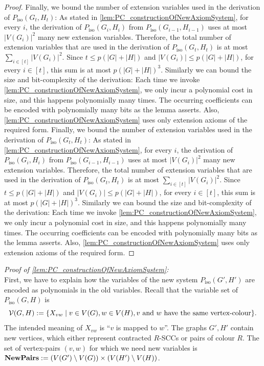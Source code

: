 \documentclass[10pt,a4paper]{article}
\newcommand{\Pairs}{\text{\upshape \textbf{NewPairs}}}
\newcommand{\Vv}{{\cal V}}
\newcommand{\Piso}{P_{\text{iso}}}
\begin{document}
\begin{proof}
		Finally, we bound the number of extension variables used in the derivation of $\Piso(G_t,H_t)$: As stated in \autoref{lem:PC_constructionOfNewAxiomSystem}, for every $i$, the derivation of $\Piso(G_i,H_i)$ from $\Piso(G_{i-1}, H_{i-1})$ uses at most $|V(G_i)|^2$ many new extension variables.
		Therefore, the total number of extension variables that are used in the derivation of $\Piso(G_t,H_t)$ is at most $\sum_{i \in [t]} |V(G_i)|^2$. Since $t \leq p(|G| + |H|)$ and $|V(G_i)| \leq p(|G| + |H|)$, for every $i \in [t]$, this sum is at most $p(|G| + |H|)^3$. Similarly we can bound the size and bit-complexity of the derivation: Each time we invoke \autoref{lem:PC_constructionOfNewAxiomSystem}, we only incur a polynomial cost in size, and this happens polynomially many times. The occurring coefficients can be encoded with polynomially many bits as the lemma asserts. Also, \autoref{lem:PC_constructionOfNewAxiomSystem} uses only extension axioms of the required form.
		Finally, we bound the number of extension variables used in the derivation of $\Piso(G_t,H_t)$: As stated in \autoref{lem:PC_constructionOfNewAxiomSystem}, for every $i$, the derivation of $\Piso(G_i,H_i)$ from $\Piso(G_{i-1}, H_{i-1})$ uses at most $|V(G_i)|^2$ many new extension variables.
		Therefore, the total number of extension variables that are used in the derivation of $\Piso(G_t,H_t)$ is at most $\sum_{i \in [t]} |V(G_i)|^2$. Since $t \leq p(|G| + |H|)$ and $|V(G_i)| \leq p(|G| + |H|)$, for every $i \in [t]$, this sum is at most $p(|G| + |H|)^3$. Similarly we can bound the size and bit-complexity of the derivation: Each time we invoke \autoref{lem:PC_constructionOfNewAxiomSystem}, we only incur a polynomial cost in size, and this happens polynomially many times. The occurring coefficients can be encoded with polynomially many bits as the lemma asserts. Also, \autoref{lem:PC_constructionOfNewAxiomSystem} uses only extension axioms of the required form.
	\end{proof}
	\textit{Proof of \autoref{lem:PC_constructionOfNewAxiomSystem}:}\\
	First, we have to explain how the variables of the new system $\Piso(G',H')$ are encoded as polynomials in the old variables. 
	Recall that the variable set of $\Piso(G,H)$ is 
	\[
	\Vv(G,H) :=   \{ X_{vw} \mid v \in V(G), w \in V(H), v \text{ and } w \text{ have the same vertex-colour}  \}.
	\]
	The intended meaning of $X_{vw}$ is ``$v$ is mapped to $w$''. The graphs $G',H'$ contain new vertices, which either represent contracted $R$-SCCs or pairs of colour $R$.
	The set of vertex-pairs $(v,w)$ for which we need new variables is $\Pairs :=  (V(G') \setminus V(G)) \times (V(H') \setminus V(H))$.\\
\end{document}
